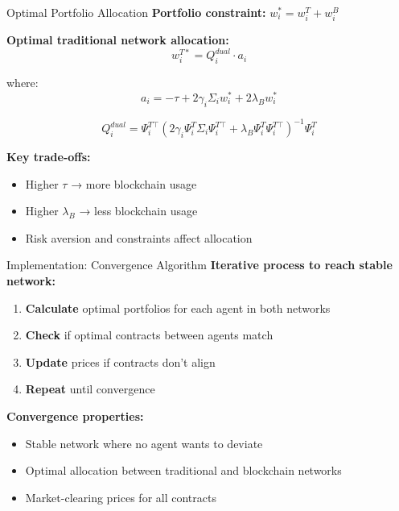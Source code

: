 \documentclass{beamer}
\begin{document}
\begin{frame}{Optimal Portfolio Allocation}
\textbf{Portfolio constraint:} $w_i^* = w_i^T + w_i^B$

\vspace{0.3cm}
\textbf{Optimal traditional network allocation:}
$$w_i^{T*} = Q_i^{dual} \cdot a_i$$

where:
$$a_i = -\tau + 2\gamma_i \Sigma_i w_i^* + 2\lambda_B w_i^*$$

$$Q_i^{dual} = \Psi_i^{T\top}(2\gamma_i\Psi_i^T \Sigma_i \Psi_i^{T\top} + \lambda_B\Psi_i^T\Psi_i^{T\top})^{-1}\Psi_i^T$$

\vspace{0.3cm}
\textbf{Key trade-offs:}
\begin{itemize}
    \item Higher $\tau$ → more blockchain usage
    \item Higher $\lambda_B$ → less blockchain usage
    \item Risk aversion and constraints affect allocation
\end{itemize}
\end{frame}

\begin{frame}{Implementation: Convergence Algorithm}
\textbf{Iterative process to reach stable network:}

\begin{enumerate}
    \item \textbf{Calculate} optimal portfolios for each agent in both networks
    \item \textbf{Check} if optimal contracts between agents match
    \item \textbf{Update} prices if contracts don't align
    \item \textbf{Repeat} until convergence
\end{enumerate}

\vspace{0.3cm}
\textbf{Convergence properties:}
\begin{itemize}
    \item Stable network where no agent wants to deviate
    \item Optimal allocation between traditional and blockchain networks
    \item Market-clearing prices for all contracts
\end{itemize}
\end{frame}
\end{document}
